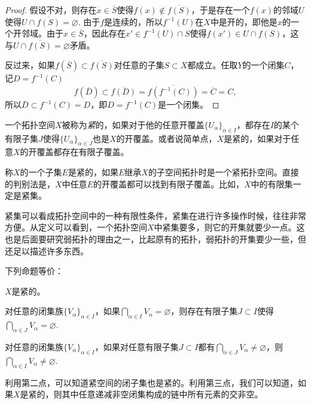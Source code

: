 \begin{proof}
假设不对，则存在$x\in \overline{S}$使得$f(x)\not\in \overline{f(S)}$，于是存在一个$f(x)$的邻域$U$使得$U\cap \overline{f(S)}=\varnothing$. 由于$f$是连续的，所以$f^{-1}(U)$在$X$中是开的，即他是$x$的一个开邻域。由于$x\in \overline{S}$，因此存在$x'\in f^{-1}(U)\cap S$使得$f(x')\in U\cap f(S)$，这与$U\cap \overline{f(S)}=\varnothing$矛盾。

反过来，如果$f(\overline{S})\subset \overline{f(S)}$对任意的子集$S\subset X$都成立。任取$Y$的一个闭集$C$，记$D=f^{-1}(C)$
\[
	f(\overline{D})\subset \overline{f(D)}=\overline{f(f^{-1}(C))}=\overline{C}=C,
\]
所以$\overline{D}\subset f^{-1}(C)=D$，即$D=f^{-1}(C)$是一个闭集。
\end{proof}

\begin{para}[紧集]
一个拓扑空间$X$被称为\textit{紧}的，如果对于他的任意开覆盖$\{U_\alpha\}_{\alpha\in I}$，都存在$I$的某个有限子集$J$使得$\{U_\alpha\}_{\alpha\in J}$也是$X$的开覆盖。或者说简单点，$X$是紧的，如果对于任意$X$的开覆盖都存在有限子覆盖。

称$X$的一个子集$E$是紧的，如果$E$继承$X$的子空间拓扑时是一个紧拓扑空间。直接的判别法是，$X$中任意$E$的开覆盖都可以找到有限子覆盖。比如，$X$中的有限集一定是紧集。
\end{para}

紧集可以看成拓扑空间中的一种有限性条件，紧集在进行许多操作时候，往往非常方便。从定义可以看到，一个拓扑空间$X$中紧集要多，则它的开集就要少一点。这也是后面要研究弱拓扑的理由之一，比起原有的拓扑，弱拓扑的开集要少一些，但还足以描述许多东西。

\begin{pro}\label{pro:0.1}
下列命题等价：
\begin{compactenum}[(1)]
\item $X$是紧的。

\item 对任意的闭集族$\{V_\alpha\}_{\alpha\in I}$，如果$\bigcap_{\alpha\in I} V_\alpha=\varnothing$，则存在有限子集$J\subset I$使得$\bigcap_{\alpha\in J} V_\alpha=\varnothing$.

\item 对任意的闭集族$\{V_\alpha\}_{\alpha\in I}$，如果对任意有限子集$J\subset I$都有$\bigcap_{\alpha\in J} V_\alpha\neq\varnothing$，则$\bigcap_{\alpha\in I} V_\alpha\neq\varnothing$.
\end{compactenum}
\end{pro}

利用第二点，可以知道紧空间的闭子集也是紧的。利用第三点，我们可以知道，如果$X$是紧的，则其中任意递减非空闭集构成的链中所有元素的交非空。

